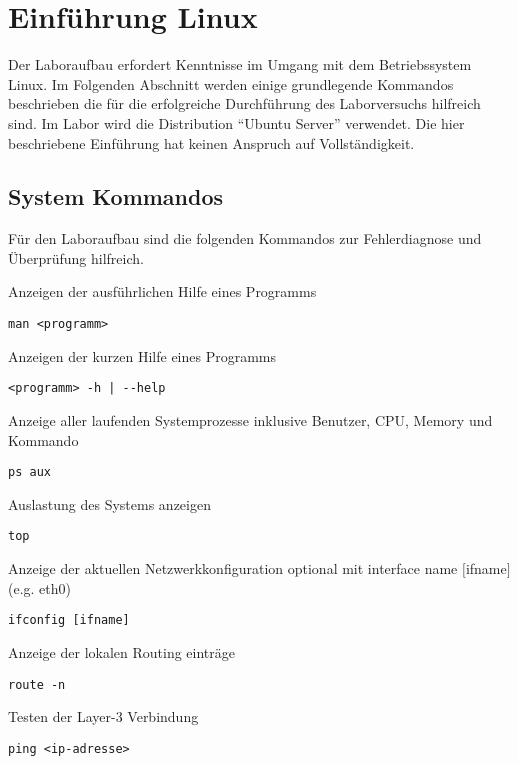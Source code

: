 \section{Einführung Linux}
Der Laboraufbau erfordert Kenntnisse im Umgang mit dem Betriebssystem Linux. Im
Folgenden Abschnitt werden einige grundlegende Kommandos beschrieben die für die
erfolgreiche Durchführung des Laborversuchs hilfreich sind. Im Labor wird die
Distribution "`Ubuntu Server"' verwendet. Die hier beschriebene Einführung hat
keinen Anspruch auf Vollständigkeit.

\subsection{System Kommandos}
Für den Laboraufbau sind die folgenden Kommandos zur Fehlerdiagnose und
Überprüfung hilfreich.

Anzeigen der ausführlichen Hilfe eines Programms
\begin{lstlisting}
man <programm> 
\end{lstlisting}

Anzeigen der kurzen Hilfe eines Programms
\begin{lstlisting}
<programm> -h | --help
\end{lstlisting}

Anzeige aller laufenden Systemprozesse inklusive Benutzer, CPU, Memory und
Kommando
\begin{lstlisting}
ps aux 
\end{lstlisting}

Auslastung des Systems anzeigen
\begin{lstlisting}
top
\end{lstlisting}

Anzeige der aktuellen Netzwerkkonfiguration optional mit interface name
$[$ifname$]$ (e.g. eth0)
\begin{lstlisting}
ifconfig [ifname]
\end{lstlisting}

Anzeige der lokalen Routing einträge
\begin{lstlisting}
route -n
\end{lstlisting}

Testen der Layer-3 Verbindung
\begin{lstlisting}
ping <ip-adresse>
\end{lstlisting}

